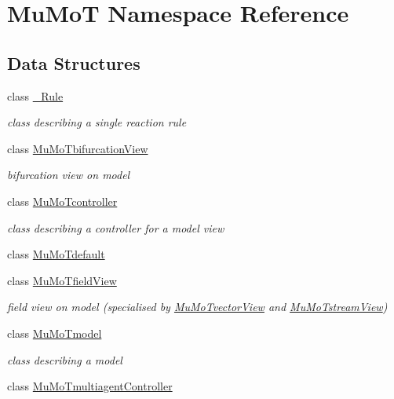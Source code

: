 \hypertarget{namespace_mu_mo_t}{}\section{Mu\+MoT Namespace Reference}
\label{namespace_mu_mo_t}
\subsection*{Data Structures}
\begin{DoxyCompactItemize}
\item 
class \hyperlink{class_mu_mo_t_1_1___rule}{\+\_\+\+Rule}
\begin{DoxyCompactList}\small\item\em class describing a single reaction rule \end{DoxyCompactList}\item 
class \hyperlink{class_mu_mo_t_1_1_mu_mo_tbifurcation_view}{Mu\+Mo\+Tbifurcation\+View}
\begin{DoxyCompactList}\small\item\em bifurcation view on model \end{DoxyCompactList}\item 
class \hyperlink{class_mu_mo_t_1_1_mu_mo_tcontroller}{Mu\+Mo\+Tcontroller}
\begin{DoxyCompactList}\small\item\em class describing a controller for a model view \end{DoxyCompactList}\item 
class \hyperlink{class_mu_mo_t_1_1_mu_mo_tdefault}{Mu\+Mo\+Tdefault}
\item 
class \hyperlink{class_mu_mo_t_1_1_mu_mo_tfield_view}{Mu\+Mo\+Tfield\+View}
\begin{DoxyCompactList}\small\item\em field view on model (specialised by \hyperlink{class_mu_mo_t_1_1_mu_mo_tvector_view}{Mu\+Mo\+Tvector\+View} and \hyperlink{class_mu_mo_t_1_1_mu_mo_tstream_view}{Mu\+Mo\+Tstream\+View}) \end{DoxyCompactList}\item 
class \hyperlink{class_mu_mo_t_1_1_mu_mo_tmodel}{Mu\+Mo\+Tmodel}
\begin{DoxyCompactList}\small\item\em class describing a model \end{DoxyCompactList}\item 
class \hyperlink{class_mu_mo_t_1_1_mu_mo_tmultiagent_controller}{Mu\+Mo\+Tmultiagent\+Controller}

\end{DoxyCompactItemize}
